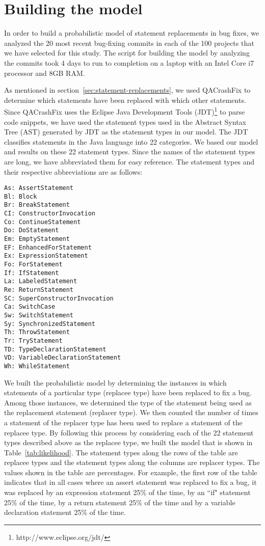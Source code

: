 
\section{Building the model}

In order to build a probabilistic model of statement replacements in bug fixes, we analyzed the 20 most recent bug-fixing commits in each of the 100 projects that we have selected for this study. The script for building the model by analyzing the commits took 4 days to run to completion on a laptop with an Intel Core i7 processor and 8GB RAM.

As mentioned in section~\ref{sec:statement-replacements}, we used QACrashFix to determine which statements have been replaced with which other statements. Since QACrashFix uses the Eclipse Java Development Tools (JDT)\footnote{http://www.eclipse.org/jdt/} to parse code snippets, we have used the statement types used in the Abstract Syntax Tree (AST) generated by JDT as the statement types in our model. The JDT classifies statements in the Java language into 22 categories. We based our model and results on these 22 statement types. Since the names of the statement types are long, we have abbreviated them for easy reference. The statement types and their respective abbreviations are as follows:

\begin{verbatim}
As: AssertStatement
Bl: Block
Br: BreakStatement
CI: ConstructorInvocation
Co: ContinueStatement
Do: DoStatement
Em: EmptyStatement
EF: EnhancedForStatement
Ex: ExpressionStatement
Fo: ForStatement
If: IfStatement
La: LabeledStatement
Re: ReturnStatement
SC: SuperConstructorInvocation
Ca: SwitchCase
Sw: SwitchStatement
Sy: SynchronizedStatement
Th: ThrowStatement
Tr: TryStatement
TD: TypeDeclarationStatement
VD: VariableDeclarationStatement
Wh: WhileStatement
\end{verbatim}

We built the probabilistic model by determining the instances in which statements of a particular type (replacee type) have been replaced to fix a bug. Among those instances, we determined the type of the statement being used as the replacement statement (replacer type). We then counted the number of times a statement of the replacer type has been used to replace a statement of the replacee type. By following this process by considering each of the 22 statement types described above as the replacee type, we built the model that is shown in Table~\ref{tab:likelihood}. The statement types along the rows of the table are replacee types and the statement types along the columns are replacer types. The values shown in the table are percentages. For example, the first row of the table indicates that in all cases where an assert statement was replaced to fix a bug, it was replaced by an expression statement 25\% of the time, by an ``if" statement 25\% of the time, by a return statement 25\% of the time and by a variable declaration statement 25\% of the time.

